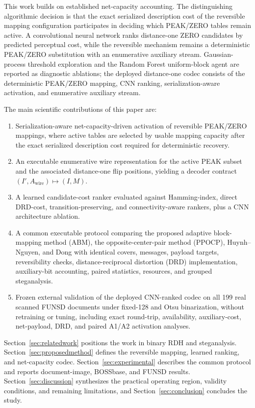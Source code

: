 \documentclass[a4paper,fleqn]{cas-dc}
\newcommand{\RevisionAddBegin}{\begingroup}
\newcommand{\RevisionAddEnd}{\endgroup}
\newcommand{\RevisionAddBegin}{\begingroup\color{revisionblue}}
\newcommand{\RevisionAddEnd}{\endgroup}
\begin{document}
\RevisionAddBegin
This work builds on established net-capacity accounting. The distinguishing
algorithmic decision is that the exact serialized description cost of the
reversible mapping configuration participates in deciding which PEAK/ZERO
tables remain active. A convolutional neural network ranks
distance-one ZERO candidates by predicted perceptual cost, while the
reversible mechanism remains a deterministic PEAK/ZERO substitution with an
enumerative auxiliary stream. Gaussian-process threshold exploration and the
Random Forest uniform-block agent are reported as diagnostic ablations; the
deployed distance-one codec consists of the deterministic PEAK/ZERO mapping,
CNN ranking, serialization-aware activation, and enumerative auxiliary stream.
\RevisionAddEnd

The main scientific contributions of this paper are:
\begin{enumerate}
\RevisionAddBegin
    \item Serialization-aware net-capacity-driven activation of reversible
    PEAK/ZERO mappings, where active tables are selected by usable mapping capacity
    after the exact serialized description cost required for deterministic
    recovery.
    \item An executable enumerative wire representation for the active PEAK
    subset and the associated distance-one flip positions, yielding a decoder
    contract $(I',A_{\mathrm{wire}})\mapsto(I,M)$.
    \item A learned candidate-cost ranker evaluated against Hamming-index,
    direct DRD-cost, transition-preserving, and connectivity-aware rankers, plus
    a CNN architecture ablation.
    \item A common executable protocol comparing the proposed adaptive
    block-mapping method (ABM), the opposite-center-pair method (PPOCP),
    Huynh--Nguyen, and Dong with identical
    covers, messages, payload targets, reversibility checks,
    distance-reciprocal distortion (DRD) implementation, auxiliary-bit
    accounting, paired statistics, resources, and grouped steganalysis.
    \item Frozen external validation of the deployed CNN-ranked codec on all
    199 real scanned FUNSD documents under fixed-128 and Otsu binarization,
    without retraining or tuning, including exact round-trip, availability,
    auxiliary-cost, net-payload, DRD, and paired A1/A2 activation analyses.
\RevisionAddEnd
\end{enumerate}

Section~\ref{sec:relatedwork} positions the work in binary RDH and
steganalysis. Section~\ref{sec:proposedmethod} defines the reversible mapping,
learned ranking, and net-capacity codec. Section~\ref{sec:experimental}
\RevisionAddBegin
describes the common protocol and reports document-image, BOSSbase, and FUNSD
results. Section~\ref{sec:discussion} synthesizes the practical operating
region, validity conditions, and remaining limitations, and
Section~\ref{sec:conclusion} concludes the study.
\RevisionAddEnd
\end{document}
